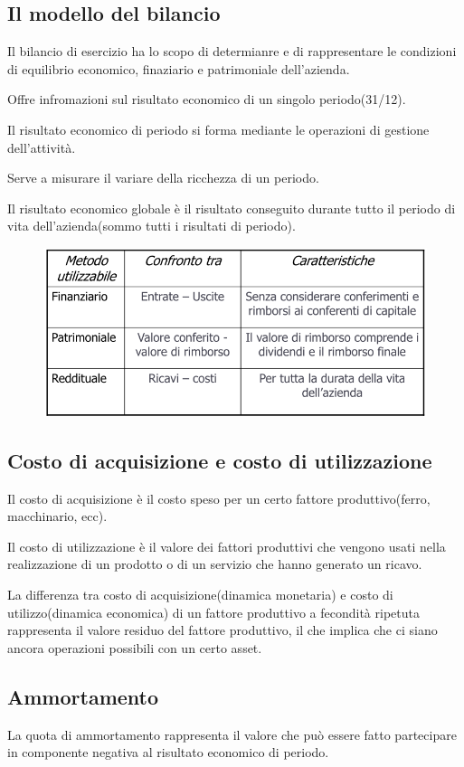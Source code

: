 \subsection{Il modello del bilancio}
Il bilancio di esercizio ha lo scopo di determianre e di rappresentare le condizioni di equilibrio
economico, finaziario e patrimoniale dell'azienda.

Offre infromazioni sul risultato economico di un singolo periodo(31/12).


Il risultato economico di periodo si forma mediante le operazioni di gestione dell'attività.

Serve a misurare il variare della ricchezza di un periodo.


Il risultato economico globale è il risultato conseguito durante tutto il periodo di vita dell'azienda(sommo tutti i risultati di periodo).

\begin{figure}[H]
    \centering
    \includegraphics[width=0.7\linewidth]{2/img/Screenshot from 2022-07-06 15-27-34.png}
\end{figure}

\subsection{Costo di acquisizione e costo di utilizzazione}

Il costo di acquisizione è il costo speso per un certo fattore produttivo(ferro, macchinario, ecc).


Il costo di utilizzazione è il valore dei fattori produttivi che vengono usati nella realizzazione
di un prodotto o di un servizio che hanno generato un ricavo.


La differenza tra costo di acquisizione(dinamica monetaria) e costo di utilizzo(dinamica economica)
 di un fattore produttivo a fecondità ripetuta rappresenta il valore residuo del fattore produttivo, il che implica che ci siano
 ancora operazioni possibili con un certo asset.

 \subsection{Ammortamento}
 La quota di ammortamento rappresenta il valore che può essere fatto partecipare in componente negativa 
 al risultato economico di periodo.

